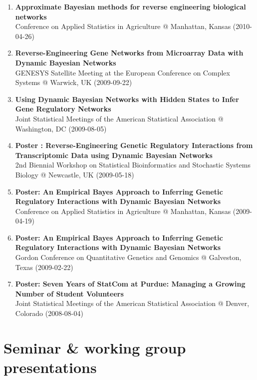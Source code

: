 \documentclass[11pt, a4paper]{awesome-cv}
\begin{document}
\begin{enumerate}
\item
  \textbf{Approximate Bayesian methods for reverse engineering
  biological networks}\\
  Conference on Applied Statistics in Agriculture @ Manhattan, Kansas
  (2010-04-26)
\item
  \textbf{Reverse-Engineering Gene Networks from Microarray Data with
  Dynamic Bayesian Networks}\\
  GENESYS Satellite Meeting at the European Conference on Complex
  Systems @ Warwick, UK (2009-09-22)
\item
  \textbf{Using Dynamic Bayesian Networks with Hidden States to Infer
  Gene Regulatory Networks}\\
  Joint Statistical Meetings of the American Statistical Association @
  Washington, DC (2009-08-05)
\item
  \textbf{Poster : Reverse-Engineering Genetic Regulatory Interactions
  from Transcriptomic Data using Dynamic Bayesian Networks}\\
  2nd Biennial Workshop on Statistical Bioinformatics and Stochastic
  Systems Biology @ Newcastle, UK (2009-05-18)
\item
  \textbf{Poster: An Empirical Bayes Approach to Inferring Genetic
  Regulatory Interactions with Dynamic Bayesian Networks}\\
  Conference on Applied Statistics in Agriculture @ Manhattan, Kansas
  (2009-04-19)
\item
  \textbf{Poster: An Empirical Bayes Approach to Inferring Genetic
  Regulatory Interactions with Dynamic Bayesian Networks}\\
  Gordon Conference on Quantitative Genetics and Genomics @ Galveston,
  Texas (2009-02-22)
\item
  \textbf{Poster: Seven Years of StatCom at Purdue: Managing a Growing
  Number of Student Volunteers}\\
  Joint Statistical Meetings of the American Statistical Association @
  Denver, Colorado (2008-08-04)
\end{enumerate}

\hypertarget{seminar-working-group-presentations}{%
\section{Seminar \& working group
presentations}\label{seminar-working-group-presentations}}
\end{document}
